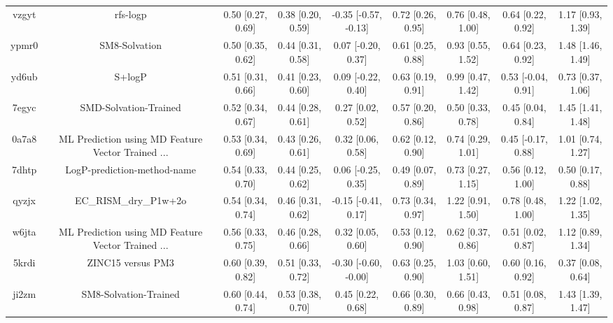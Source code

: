 \documentclass{article}
\begin{document}
\begin{center}
\begin{longtable}{|ccccccccc|}
 vzgyt &                                           rfs-logp &  0.50 [0.27, 0.69] &  0.38 [0.20, 0.59] &  -0.35 [-0.57, -0.13] &  0.72 [0.26, 0.95] &    0.76 [0.48, 1.00] &    0.64 [0.22, 0.92] &     1.17 [0.93, 1.39] \\
 ypmr0 &                                      SM8-Solvation &  0.50 [0.35, 0.62] &  0.44 [0.31, 0.58] &    0.07 [-0.20, 0.37] &  0.61 [0.25, 0.88] &    0.93 [0.55, 1.52] &    0.64 [0.23, 0.92] &     1.48 [1.46, 1.49] \\
 yd6ub &                                             S+logP &  0.51 [0.31, 0.66] &  0.41 [0.23, 0.60] &    0.09 [-0.22, 0.40] &  0.63 [0.19, 0.91] &    0.99 [0.47, 1.42] &   0.53 [-0.04, 0.91] &     0.73 [0.37, 1.06] \\
 7egyc &                              SMD-Solvation-Trained &  0.52 [0.34, 0.67] &  0.44 [0.28, 0.61] &     0.27 [0.02, 0.52] &  0.57 [0.20, 0.86] &    0.50 [0.33, 0.78] &    0.45 [0.04, 0.84] &     1.45 [1.41, 1.48] \\
 0a7a8 &  ML Prediction using MD Feature Vector Trained ... &  0.53 [0.34, 0.69] &  0.43 [0.26, 0.61] &     0.32 [0.06, 0.58] &  0.62 [0.12, 0.90] &    0.74 [0.29, 1.01] &   0.45 [-0.17, 0.88] &     1.01 [0.74, 1.27] \\
 7dhtp &                        LogP-prediction-method-name &  0.54 [0.33, 0.70] &  0.44 [0.25, 0.62] &    0.06 [-0.25, 0.35] &  0.49 [0.07, 0.89] &    0.73 [0.27, 1.15] &    0.56 [0.12, 1.00] &     0.50 [0.17, 0.88] \\
 qyzjx &                              EC\_RISM\_dry\_P1w+2o &  0.54 [0.34, 0.74] &  0.46 [0.31, 0.62] &   -0.15 [-0.41, 0.17] &  0.73 [0.34, 0.97] &    1.22 [0.91, 1.50] &    0.78 [0.48, 1.00] &     1.22 [1.02, 1.35] \\
 w6jta &  ML Prediction using MD Feature Vector Trained ... &  0.56 [0.33, 0.75] &  0.46 [0.28, 0.66] &     0.32 [0.05, 0.60] &  0.53 [0.12, 0.90] &    0.62 [0.37, 0.86] &    0.51 [0.02, 0.87] &     1.12 [0.89, 1.34] \\
 5krdi &                                  ZINC15 versus PM3 &  0.60 [0.39, 0.82] &  0.51 [0.33, 0.72] &  -0.30 [-0.60, -0.00] &  0.63 [0.25, 0.90] &    1.03 [0.60, 1.51] &    0.60 [0.16, 0.92] &     0.37 [0.08, 0.64] \\
 ji2zm &                              SM8-Solvation-Trained &  0.60 [0.44, 0.74] &  0.53 [0.38, 0.70] &     0.45 [0.22, 0.68] &  0.66 [0.30, 0.89] &    0.66 [0.43, 0.98] &    0.51 [0.08, 0.87] &     1.43 [1.39, 1.47] \\

\end{longtable}
\end{center}
\end{document}
